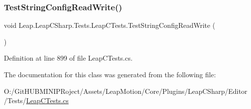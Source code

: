 \subsubsection{\texorpdfstring{TestStringConfigReadWrite()}{TestStringConfigReadWrite()}}
{\footnotesize\ttfamily void Leap.\+Leap\+C\+Sharp.\+Tests.\+Leap\+C\+Tests.\+Test\+String\+Config\+Read\+Write (\begin{DoxyParamCaption}{ }\end{DoxyParamCaption})}



Definition at line 899 of file Leap\+C\+Tests.\+cs.



The documentation for this class was generated from the following file\+:\begin{DoxyCompactItemize}
\item 
O\+:/\+Git\+H\+U\+B\+M\+I\+N\+I\+P\+Roject/\+Assets/\+Leap\+Motion/\+Core/\+Plugins/\+Leap\+C\+Sharp/\+Editor/\+Tests/\mbox{\hyperlink{_leap_c_tests_8cs}{Leap\+C\+Tests.\+cs}}\end{DoxyCompactItemize}
